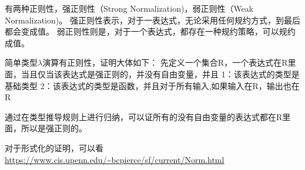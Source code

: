 有两种正则性，强正则性（Strong Normalization)，弱正则性（Weak  Normalization)。
强正则性表示，对于一表达式，无论采用任何规约方式，到最后都会变成值。
弱正则性则是，对于一个表达式，都存在一种规约策略，可以规约成值。

简单类型$\lambda$演算有正则性，证明大体如下：
先定义一个集合R，一个表达式在R里面，当且仅当该表达式是强正则的，并没有自由变量，并且
1：该表达式的类型是基础类型
2：该表达式的类型是函数，并且对于所有输入,如果输入在R，输出也在R

通过在类型推导规则上进行归纳，可以证所有的没有自由变量的表达式都在R里面，所以是强正则的。

对于形式化的证明，可以看 \url {https://www.cis.upenn.edu/~bcpierce/sf/current/Norm.html}
